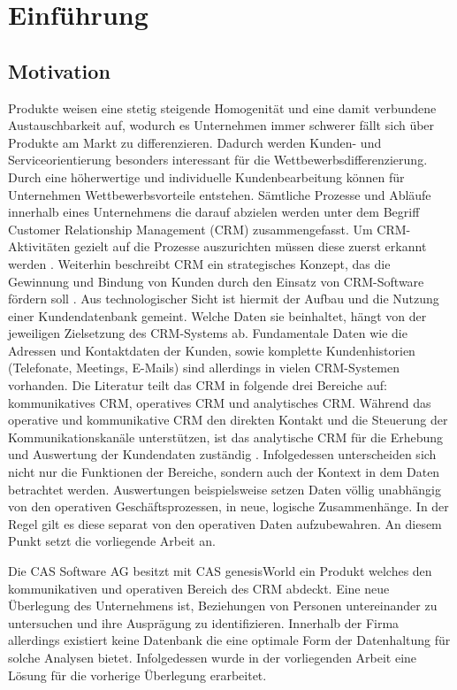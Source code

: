 \chapter{Einführung}
\label{ch:Einfuehrung}

\section{Motivation}
\label{ch:Einfuehrung:sec:Motivation}

Produkte weisen eine stetig steigende Homogenität und eine damit verbundene Austauschbarkeit auf, wodurch es Unternehmen immer schwerer fällt sich über Produkte am Markt zu differenzieren. Dadurch werden Kunden- und Serviceorientierung besonders interessant für die Wettbewerbsdifferenzierung. Durch eine höherwertige und individuelle Kundenbearbeitung können für Unternehmen Wettbewerbsvorteile entstehen. Sämtliche Prozesse und Abläufe innerhalb eines Unternehmens die darauf abzielen werden unter dem Begriff Customer Relationship Management (CRM) zusammengefasst. Um CRM-Aktivitäten gezielt auf die Prozesse auszurichten müssen diese zuerst erkannt werden \cite{SWB-1001}. Weiterhin beschreibt CRM ein strategisches Konzept, das die Gewinnung und Bindung von Kunden durch den Einsatz von CRM-Software fördern soll \cite{SWB-1001}. Aus technologischer Sicht ist hiermit der Aufbau und die Nutzung einer Kundendatenbank gemeint. Welche Daten sie beinhaltet, hängt von der jeweiligen Zielsetzung des CRM-Systems ab. Fundamentale Daten wie die Adressen und Kontaktdaten der Kunden, sowie komplette Kundenhistorien (Telefonate, Meetings, E-Mails) sind allerdings in vielen CRM-Systemen vorhanden. Die Literatur teilt das CRM in folgende drei Bereiche auf: kommunikatives CRM, operatives CRM und analytisches CRM. Während das operative und kommunikative CRM den direkten Kontakt und die Steuerung der Kommunikationskanäle unterstützen, ist das analytische CRM für die Erhebung und Auswertung der Kundendaten zuständig \cite{SWB-375372644}. Infolgedessen unterscheiden sich nicht nur die Funktionen der Bereiche, sondern auch der Kontext in dem Daten betrachtet werden. Auswertungen beispielsweise setzen Daten völlig unabhängig von den operativen Geschäftsprozessen, in neue, logische Zusammenhänge. In der Regel gilt es diese separat von den operativen Daten aufzubewahren. An diesem Punkt setzt die vorliegende Arbeit an. 

Die CAS Software AG besitzt mit CAS genesisWorld ein Produkt welches den kommunikativen und operativen Bereich des CRM abdeckt. Eine neue Überlegung des Unternehmens ist, Beziehungen von Personen untereinander zu untersuchen und ihre Ausprägung zu identifizieren. Innerhalb der Firma allerdings existiert keine Datenbank die eine optimale Form der Datenhaltung für solche Analysen bietet. Infolgedessen wurde in der vorliegenden Arbeit eine Lösung für die vorherige Überlegung erarbeitet.


